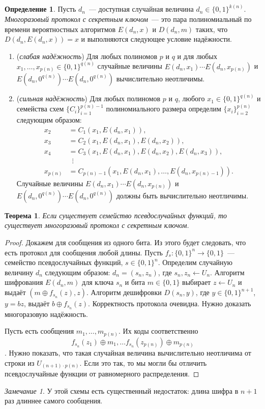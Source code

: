 \documentclass[12pt]{article}
\newcommand{\bits}{\{0,1\}}
\theoremstyle{definition}
\newtheorem{definition}{Определение}[section]
\theoremstyle{plain}
\newtheorem{theorem}{Теорема}[section]
\theoremstyle{remark}
\newtheorem{remark}{Замечание}[section]
\begin{document}
\begin{definition}
Пусть $d_n$~--- доступная случайная величина $d_n\in\bits^{k(n)}$.
\emph{Многоразовый протокол с секретным ключом}~--- это пара
полиномиальный по времени вероятностных алгоритмов $E(d_n, x)$ и 
$D(d_n, m)$ таких, что $D(d_n, E(d_n, x)) = x$ и выполняются
следующее условие надёжности.
\begin{enumerate}[label=\alph*)]
\item (\emph{слабая надёжность}) Для любых полиномов $p$ и $q$ и для любых $x_1,\dotsc,x_{p(n)}\in\bits^{q(n)}$
случайные величины $E(d_n,x_1)\dotsb E(d_n,x_{p(n)})$ и
$E(d_n,0^{q(n)})\dotsb E(d_n,0^{q(n)})$ вычислительно неотличимы.
\item (\emph{сильная надёжность})
 Для любых полиномов $p$ и $q$, любого $x_1\in\bits^{q(n)}$
 и семейства схем $\{C_i\}_{i=1}^{p(n) - 1}$ полиномиального размера
 определим $\{x_i\}_{i=2}^{p(n)}$ следующим образом:
 $$
 \begin{aligned}
 x_2 &= C_1(x_1, E(d_n, x_1)),\\
 x_3 &= C_2(x_1, E(d_n, x_1),E(d_n, x_2)),\\
 x_4 &= C_3(x_1, E(d_n, x_1),E(d_n, x_2),E(d_n, x_3)),\\
 &\ \;\vdots\\ 
 x_{p(n)} &= C_{p(n)-1}(x_1, E(d_n, x_1),\dotsc,E(d_n, x_{p(n) - 1})).
 \end{aligned}
 $$
Случайные величины $E(d_n,x_1)\dotsb E(d_n,x_{p(n)})$ и
$E(d_n,0^{q(n)})\dotsb E(d_n,0^{q(n)})$ должны быть вычислительно неотличимы.
\end{enumerate}
\end{definition}

\begin{theorem}
Если существует семейство псевдослучайных функций, то существует многоразовый протокол с секретным ключом.
\end{theorem}
\begin{proof}
Докажем для сообщения из одного бита. Из этого будет следовать, что есть протокол для сообщения любой длины.
Пусть $f_s:\bits^n\to\bits$~--- семейство псевдослучайных функций, $s\in\bits^n$. Определим случайную величину $d_n$ следующим образом: $d_n=(s_n, z_n)$, где $s_n,z_n\gets U_n$. Алгоритм шифрования $E(d_n,m)$
для ключа $s_n$ и бита $m\in\bits$ выбирает $z\gets U_n$ и выдаёт $(m\oplus f_{s_n}(z),z)$. Алгоритм дешифровки $D(s_n, y)$, где $y\in\bits^{n+1}$, $y=bz$, выдаёт $b\oplus f_{s_n}(z)$. Корректность
протокола очевидна. Нужно доказать многоразовую надёжность.

Пусть есть сообщения $m_1,\dotsc,m_{p(n)}$. Их коды соответственно
$$f_{s_n}(z_1)\oplus m_1,\dotsc
f_{s_n}(z_{p(n)})\oplus m_{p(n)}$$.
Нужно показать, что такая случайная величина вычислительно неотличима
от строки из $U_{(n+1)\cdot p(n)}$. Если это так, то 
мы могли бы отличить псевдослучайные функции от равномерного распределения.
\end{proof}
\begin{remark}
У этой схемы есть существенный недостаток: длина шифра в $n+1$ раз
длиннее самого сообщения.
\end{remark}
\end{document}
